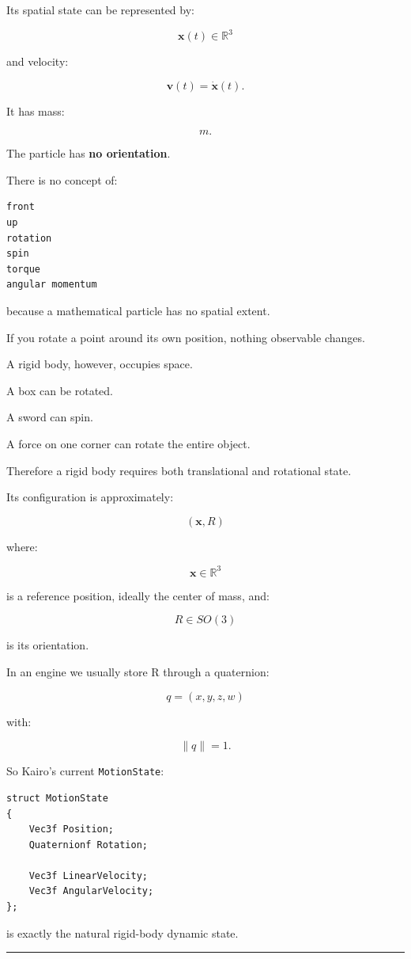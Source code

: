Its spatial state can be represented by:

\[
\mathbf{x}(t)\in\mathbb{R}^3
\]

and velocity:

\[
\mathbf{v}(t)=\dot{\mathbf{x}}(t).
\]

It has mass:

\[
m.
\]

The particle has \textbf{no orientation}.

There is no concept of:

\begin{verbatim}
front
up
rotation
spin
torque
angular momentum
\end{verbatim}

because a mathematical particle has no spatial extent.

If you rotate a point around its own position, nothing observable changes.

A rigid body, however, occupies space.

A box can be rotated.

A sword can spin.

A force on one corner can rotate the entire object.

Therefore a rigid body requires both translational and rotational state.

Its configuration is approximately:

\[
(\mathbf{x},R)
\]

where:

\[
\mathbf{x}\in\mathbb{R}^{3}
\]

is a reference position, ideally the center of mass, and:

\[
R\in SO(3)
\]

is its orientation.

In an engine we usually store R through a quaternion:

\[
q=(x,y,z,w)
\]

with:

\[
\|q\|=1.
\]

So Kairo's current \texttt{MotionState}:

\begin{verbatim}
struct MotionState
{
    Vec3f Position;
    Quaternionf Rotation;

    Vec3f LinearVelocity;
    Vec3f AngularVelocity;
};
\end{verbatim}

is exactly the natural rigid-body dynamic state.

\begin{center}\rule{0.5\linewidth}{0.5pt}\end{center}

